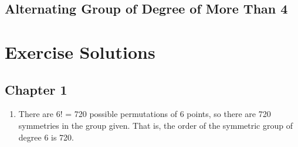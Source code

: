 \section{Alternating Group of Degree of More Than 4}

\chapter*{Exercise Solutions}

\section*{Chapter 1}
\begin{enumerate}
    \item There are 6! = 720 possible permutations of 6 points, so there are 720 symmetries in the group given. That is, the order of the symmetric group of degree 6 is 720.
\end{enumerate}

